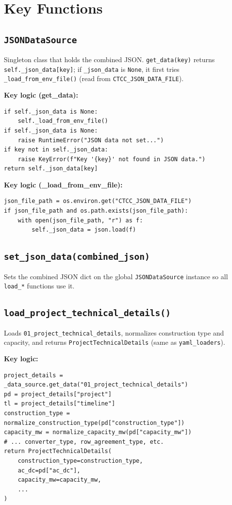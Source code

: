 \documentclass[ctcc_full_documentation.tex]{subfiles}
\begin{document}
\section{Key Functions}

\subsection{\texttt{JSONDataSource}}

Singleton class that holds the combined JSON. \texttt{get\_data(key)} returns \texttt{self.\_json\_data[key]}; if \texttt{\_json\_data} is \texttt{None}, it first tries \texttt{\_load\_from\_env\_file()} (read from \texttt{CTCC\_JSON\_DATA\_FILE}).

\textbf{Key logic (get\_data):}
\begin{lstlisting}
if self._json_data is None:
    self._load_from_env_file()
if self._json_data is None:
    raise RuntimeError("JSON data not set...")
if key not in self._json_data:
    raise KeyError(f"Key '{key}' not found in JSON data.")
return self._json_data[key]
\end{lstlisting}

\textbf{Key logic (\_load\_from\_env\_file):}
\begin{lstlisting}
json_file_path = os.environ.get("CTCC_JSON_DATA_FILE")
if json_file_path and os.path.exists(json_file_path):
    with open(json_file_path, "r") as f:
        self._json_data = json.load(f)
\end{lstlisting}

\subsection{\texttt{set\_json\_data(combined\_json)}}

Sets the combined JSON dict on the global \texttt{JSONDataSource} instance so all \texttt{load\_*} functions use it.

\subsection{\texttt{load\_project\_technical\_details()}}

Loads \texttt{01\_project\_technical\_details}, normalizes construction type and capacity, and returns \texttt{ProjectTechnicalDetails} (same as \texttt{yaml\_loaders}).

\textbf{Key logic:}
\begin{lstlisting}
project_details = _data_source.get_data("01_project_technical_details")
pd = project_details["project"]
tl = project_details["timeline"]
construction_type = normalize_construction_type(pd["construction_type"])
capacity_mw = normalize_capacity_mw(pd["capacity_mw"])
# ... converter_type, row_agreement_type, etc.
return ProjectTechnicalDetails(
    construction_type=construction_type,
    ac_dc=pd["ac_dc"],
    capacity_mw=capacity_mw,
    ...
)
\end{lstlisting}
\end{document}
